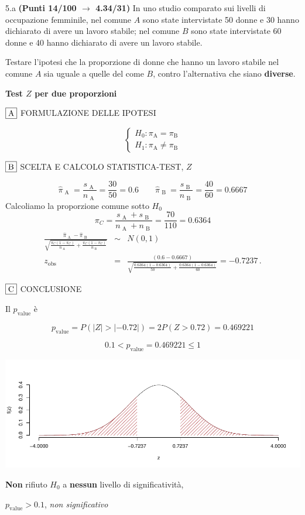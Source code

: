 \documentclass[
  11pt,
]{book}
\theoremstyle{mytheoremstyle}
\theoremstyle{mydefstyle}
\newenvironment{sol}
  {
  \begin{tcolorbox}[enhanced,breakable,arc=0.1mm,boxrule=1pt,colback=white,colframe=iblue,
  title=\bf \fontfamily{lmss}\selectfont \hspace{.5 cm} Soluzione,drop fuzzy shadow]

}{
\end{tcolorbox}
  }
\begin{document}
5.a \textbf{(Punti 14/100 \(\rightarrow\) 4.34/31)} In uno studio comparato sui livelli di occupazione femminile, nel comune \(A\) sono state intervistate 50 donne e 30 hanno dichiarato di avere un lavoro stabile; nel comune \(B\) sono state intervistate 60 donne e 40 hanno dichiarato di avere un lavoro stabile.

Testare l'ipotesi che la proporzione di donne che hanno un lavoro stabile nel comune \(A\) sia uguale a quelle del come \(B\), contro l'alternativa che siano \textbf{diverse}.

\begin{sol}
\textbf{Test \(Z\) per due proporzioni}

\(\fbox{A}\) FORMULAZIONE DELLE IPOTESI

\[\begin{cases}
   H_0: \pi_\text{A} = \pi_\text{B} \\
   H_1: \pi_\text{A} \neq \pi_\text{B} 
   \end{cases}\]

\(\fbox{B}\) SCELTA E CALCOLO STATISTICA-TEST, \(Z\)

\[\hat\pi_\text{ A }=\frac{s_\text{ A }}{n_\text{ A }}=\frac{ 30 }{ 50 }= 0.6 \qquad
   \hat\pi_\text{ B }=\frac{s_\text{ B }}{n_\text{ B }}=\frac{ 40 }{ 60 }= 0.6667 \]Calcoliamo la proporzione comune sotto \(H_0\)
\[
     \pi_C=\frac{s_\text{ A }+s_\text{ B }}{n_\text{ A }+n_\text{ B }}=
     \frac{ 70 }{ 110 }= 0.6364 
   \]\begin{eqnarray*}
   \frac{\hat\pi_\text{ A } - \hat\pi_\text{ B }}
   {\sqrt{\frac {\pi_C(1-\pi_C)}{n_\text{ A }}+\frac {\pi_C(1-\pi_C)}{n_\text{ B }}}}&\sim&N(0,1)\\
   z_{\text{obs}}
   &=& \frac{ ( 0.6 -  0.6667 )} {\sqrt{\frac{ 0.6364 (1- 0.6364 )}{ 50 }+\frac{ 0.6364 (1- 0.6364 )}{ 60 }}}
   =   -0.7237 \, .
   \end{eqnarray*}

\(\fbox{C}\) CONCLUSIONE

Il \(p_{\text{value}}\) è

\[ p_{\text{value}} = P(|Z|>|-0.72|)=2P(Z>0.72)=0.469221 \]

\[
 0.1 < p_\text{value}= 0.469221 \leq 1 
\]

\begin{center}\includegraphics{Esami_passati_con_soluzioni_files/figure-latex/2021-4,-1} \end{center}

\textbf{Non} rifiuto \(H_0\) a \textbf{nessun}
livello di significatività,

\(p_\text{value}>0.1\),
\emph{non significativo}

\end{sol}
\end{document}
